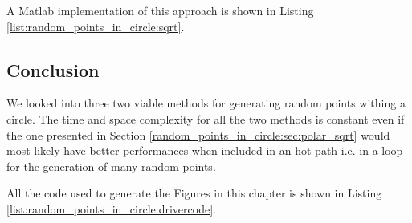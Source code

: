 A Matlab implementation of this approach is shown in Listing \ref{list:random_points_in_circle:sqrt}.



\subsection{Conclusion}
We looked into three two viable methods for generating random points withing a circle. The time and space complexity for all the two methods is constant even if the one presented in Section \ref{random_points_in_circle:sec:polar_sqrt} would most likely have better performances when included in an hot path i.e. in a loop for the generation of many random points.

All the code used to generate the Figures in this chapter is shown in Listing \ref{list:random_points_in_circle:drivercode}.



